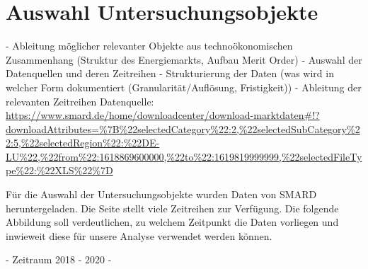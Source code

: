 \section{Auswahl Untersuchungsobjekte}
-	Ableitung möglicher relevanter Objekte aus technoökonomischen Zusammenhang (Struktur des Energiemarkts, Aufbau Merit Order)
-	Auswahl der Datenquellen und deren Zeitreihen
-	Strukturierung der Daten (was wird in welcher Form dokumentiert (Granularität/Auflösung, Fristigkeit))
-	Ableitung der relevanten Zeitreihen
Datenquelle: \url{https://www.smard.de/home/downloadcenter/download-marktdaten#!?downloadAttributes=%7B%22selectedCategory%22:2,%22selectedSubCategory%22:5,%22selectedRegion%22:%22DE-LU%22,%22from%22:1618869600000,%22to%22:1619819999999,%22selectedFileType%22:%22XLS%22%7D}


Für die Auswahl der Untersuchungsobjekte wurden Daten von SMARD heruntergeladen. Die Seite stellt viele Zeitreihen zur Verfügung.
Die folgende Abbildung soll verdeutlichen, zu welchem Zeitpunkt die Daten vorliegen und inwieweit diese für unsere Analyse verwendet werden können.


- Zeitraum 2018 - 2020
- 